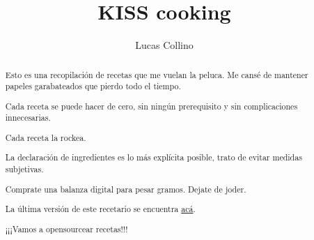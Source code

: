 \documentclass[a4paper]{article}
\title{KISS cooking}
\author{Lucas Collino}
\begin{document}
\maketitle

\newpage

\begin{abstract}

\vspace*{3\baselineskip}

Esto es una recopilación de recetas que me vuelan la peluca. Me cansé de mantener papeles garabateados que pierdo todo el tiempo.

Cada receta se puede hacer de cero, sin ningún prerequisito y sin complicaciones innecesarias.

Cada receta la rockea.

La declaración de ingredientes es lo más explícita posible, trato de evitar medidas subjetivas.

Comprate una balanza digital para pesar gramos. Dejate de joder.

La última versión de este recetario se encuentra \href{https://github.com/lucascollino/kiss_cooking}{acá}.

\vspace*{6\baselineskip}

\begin{flushright}
¡¡¡Vamos a opensourcear recetas!!!
\end{flushright}

\end{abstract}

\newpage

\tableofcontents

\newpage
\end{document}
